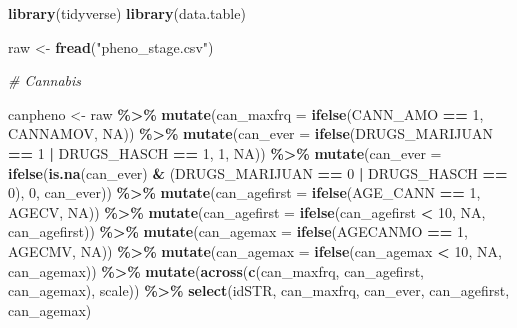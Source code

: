 \documentclass[
]{article}
\newenvironment{Shaded}{\begin{snugshade}}{\end{snugshade}}
\newcommand{\AttributeTok}[1]{\textcolor[rgb]{0.13,0.29,0.53}{#1}}
\newcommand{\CommentTok}[1]{\textcolor[rgb]{0.56,0.35,0.01}{\textit{#1}}}
\newcommand{\ConstantTok}[1]{\textcolor[rgb]{0.56,0.35,0.01}{#1}}
\newcommand{\DecValTok}[1]{\textcolor[rgb]{0.00,0.00,0.81}{#1}}
\newcommand{\FunctionTok}[1]{\textcolor[rgb]{0.13,0.29,0.53}{\textbf{#1}}}
\newcommand{\NormalTok}[1]{#1}
\newcommand{\OtherTok}[1]{\textcolor[rgb]{0.56,0.35,0.01}{#1}}
\newcommand{\SpecialCharTok}[1]{\textcolor[rgb]{0.81,0.36,0.00}{\textbf{#1}}}
\newcommand{\StringTok}[1]{\textcolor[rgb]{0.31,0.60,0.02}{#1}}
\begin{document}
\begin{Shaded}
\begin{Highlighting}[]
\FunctionTok{library}\NormalTok{(tidyverse) }
\FunctionTok{library}\NormalTok{(data.table)}

\NormalTok{raw }\OtherTok{\textless{}{-}} \FunctionTok{fread}\NormalTok{(}\StringTok{"pheno\_stage.csv"}\NormalTok{)}

\CommentTok{\# Cannabis}

\NormalTok{canpheno }\OtherTok{\textless{}{-}}\NormalTok{ raw }\SpecialCharTok{\%\textgreater{}\%} 
  \FunctionTok{mutate}\NormalTok{(}\AttributeTok{can\_maxfrq =} \FunctionTok{ifelse}\NormalTok{(CANN\_AMO }\SpecialCharTok{==} \DecValTok{1}\NormalTok{, CANNAMOV, }\ConstantTok{NA}\NormalTok{)) }\SpecialCharTok{\%\textgreater{}\%} 
  \FunctionTok{mutate}\NormalTok{(}\AttributeTok{can\_ever =} \FunctionTok{ifelse}\NormalTok{(DRUGS\_MARIJUAN }\SpecialCharTok{==} \DecValTok{1} \SpecialCharTok{|}\NormalTok{ DRUGS\_HASCH }\SpecialCharTok{==} \DecValTok{1}\NormalTok{, }\DecValTok{1}\NormalTok{, }\ConstantTok{NA}\NormalTok{)) }\SpecialCharTok{\%\textgreater{}\%} 
  \FunctionTok{mutate}\NormalTok{(}\AttributeTok{can\_ever =} \FunctionTok{ifelse}\NormalTok{(}\FunctionTok{is.na}\NormalTok{(can\_ever) }\SpecialCharTok{\&}\NormalTok{ (DRUGS\_MARIJUAN }\SpecialCharTok{==} \DecValTok{0} \SpecialCharTok{|}\NormalTok{ DRUGS\_HASCH }\SpecialCharTok{==} \DecValTok{0}\NormalTok{), }\DecValTok{0}\NormalTok{, can\_ever)) }\SpecialCharTok{\%\textgreater{}\%}
  \FunctionTok{mutate}\NormalTok{(}\AttributeTok{can\_agefirst =} \FunctionTok{ifelse}\NormalTok{(AGE\_CANN }\SpecialCharTok{==} \DecValTok{1}\NormalTok{, AGECV, }\ConstantTok{NA}\NormalTok{)) }\SpecialCharTok{\%\textgreater{}\%} 
  \FunctionTok{mutate}\NormalTok{(}\AttributeTok{can\_agefirst =} \FunctionTok{ifelse}\NormalTok{(can\_agefirst }\SpecialCharTok{\textless{}} \DecValTok{10}\NormalTok{, }\ConstantTok{NA}\NormalTok{, can\_agefirst)) }\SpecialCharTok{\%\textgreater{}\%} 
  \FunctionTok{mutate}\NormalTok{(}\AttributeTok{can\_agemax =} \FunctionTok{ifelse}\NormalTok{(AGECANMO }\SpecialCharTok{==} \DecValTok{1}\NormalTok{, AGECMV, }\ConstantTok{NA}\NormalTok{)) }\SpecialCharTok{\%\textgreater{}\%} 
  \FunctionTok{mutate}\NormalTok{(}\AttributeTok{can\_agemax =} \FunctionTok{ifelse}\NormalTok{(can\_agemax }\SpecialCharTok{\textless{}} \DecValTok{10}\NormalTok{, }\ConstantTok{NA}\NormalTok{, can\_agemax)) }\SpecialCharTok{\%\textgreater{}\%} 
   \FunctionTok{mutate}\NormalTok{(}\FunctionTok{across}\NormalTok{(}\FunctionTok{c}\NormalTok{(can\_maxfrq, can\_agefirst, can\_agemax), scale)) }\SpecialCharTok{\%\textgreater{}\%} 
  \FunctionTok{select}\NormalTok{(idSTR, can\_maxfrq, can\_ever, can\_agefirst, can\_agemax)}
  

\end{Highlighting}
\end{Shaded}
\end{document}
